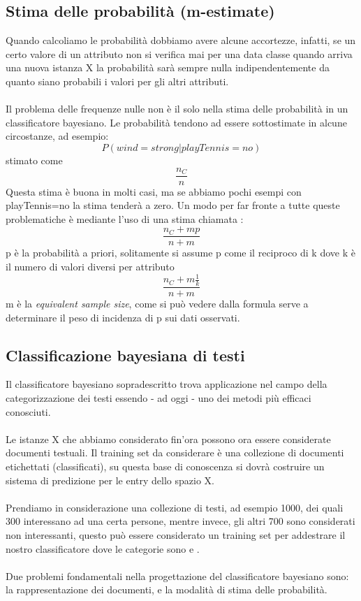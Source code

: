 \documentclass{article}
\theoremstyle{plain}
\theoremstyle{definition}
\begin{document}
\subsection{Stima delle probabilità (m-estimate)}
Quando calcoliamo le probabilità dobbiamo avere alcune accortezze, infatti, se un certo valore di un attributo non si verifica mai per una data classe quando arriva una nuova istanza X la probabilità sarà sempre nulla indipendentemente da quanto siano probabili i valori per gli altri attributi. 
\\
\\
Il problema delle frequenze nulle non è il solo nella stima delle probabilità in un classificatore bayesiano. Le probabilità tendono ad essere sottostimate in alcune circostanze, ad esempio:
$$P(wind=strong|playTennis=no)$$ stimato come $$\frac{n_C}{n}$$
Questa stima è buona in molti casi, ma se abbiamo pochi esempi con playTennis=no la stima tenderà a zero.
Un modo per far fronte a tutte queste problematiche è mediante l'uso di una stima chiamata :
$$\frac{n_C+mp}{n+m}$$
p è la probabilità a priori, solitamente si assume p come il reciproco di k dove k è il numero di valori diversi per attributo
$$\frac{n_C+m\frac{1}{k}}{n+m}$$
m è la \textit{equivalent sample size}, come si può vedere dalla formula serve a determinare il peso di incidenza di p sui dati osservati. 

\subsection{Classificazione bayesiana di testi }
Il classificatore bayesiano sopradescritto trova applicazione nel campo della categorizzazione dei testi essendo - ad oggi - uno dei metodi più efficaci conosciuti.
\footnotemark
{}
\\
\\
Le istanze X che abbiamo considerato fin'ora possono ora essere considerate documenti testuali. Il training set da considerare è una collezione di documenti etichettati (classificati), su questa base di conoscenza si dovrà costruire un sistema di predizione per le entry dello spazio X.
\\
\\
Prendiamo in considerazione una collezione di testi, ad esempio 1000, dei quali 300 interessano ad una certa persone, mentre invece, gli altri 700 sono considerati non interessanti, questo può essere considerato un training set per addestrare il nostro classificatore dove le categorie sono  e .
\\
\\
Due problemi fondamentali nella progettazione del classificatore bayesiano sono: la rappresentazione dei documenti, e la modalità di stima delle probabilità.
\end{document}
